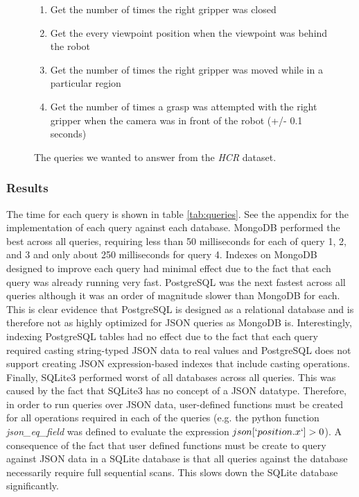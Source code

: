 \documentclass[nocopyrightspace]{acm_proc_article-sp}
\begin{document}
\begin{figure}
\begin{enumerate}[label=Q\arabic*]
    \item Get the number of times the right gripper was closed
    \item Get the every viewpoint position when the viewpoint was behind the robot
    \item Get the number of times the right gripper was moved while in a particular region
    \item Get the number of times a grasp was attempted with the right gripper when the camera was in front of the robot (+/- 0.1 seconds)
\end{enumerate}
\caption{The queries we wanted to answer from the \textit{HCR} dataset.}
\label{fig:hcrqueries}
\end{figure}

\subsubsection{Results}

The time for each query is shown in table \ref{tab:queries}. See the appendix for the implementation of each query against each database. MongoDB performed the best across all queries, requiring less than 50 milliseconds for each of query 1, 2, and 3 and only about 250 milliseconds for query 4. Indexes on MongoDB designed to improve each query had minimal effect due to the fact that each query was already running very fast. PostgreSQL was the next fastest across all queries although it was an order of magnitude slower than MongoDB for each. This is clear evidence that PostgreSQL is designed as a relational database and is therefore not as highly optimized for JSON queries as MongoDB is. Interestingly, indexing PostgreSQL tables had no effect due to the fact that each query required casting string-typed JSON data to real values and PostgreSQL does not support creating JSON expression-based indexes that include casting operations. Finally, SQLite3 performed worst of all databases across all queries. This was caused by the fact that SQLite3 has no concept of a JSON datatype. Therefore, in order to run queries over JSON data, user-defined functions must be created for all operations required in each of the queries (e.g. the python function \textit{json\_eq\_field} was defined to evaluate the expression $json[`position.x`] > 0$). A consequence of the fact that user defined functions must be create to query against JSON data in a SQLite database is that all queries against the database necessarily require full sequential scans. This slows down the SQLite database significantly.
\end{document}
